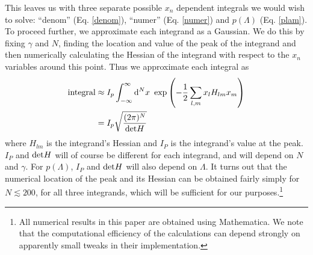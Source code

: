 \documentclass[12pt]{article}
\begin{document}
This leaves us with three separate possible $x_n$ dependent integrals we would wish to solve: ``denom'' (Eq. \ref{denom}), ``numer'' (Eq. \ref{numer}) and $p(\Lambda)$ (Eq. \ref{plam}). To proceed further, we approximate each integrand as a Gaussian. We do this by fixing $\gamma$ and $N$, finding the location and value of the peak of the integrand and then numerically calculating the Hessian of the integrand with respect to the $x_n$ variables around this point. Thus we approximate each integral as
%
\begin{align}\label{Gauss}
\begin{split}
{\rm integral} &\approx I_p\int_{-\infty}^{\infty} {\rm d}^Nx\,\, \exp\left(-\frac{1}{2}\sum_{l,m}x_lH_{lm}x_m\right) \\
&=I_p \sqrt{\frac{(2\pi)^N}{\mathrm{det} H}}
\end{split}
\end{align}
%
\noindent where $H_{lm}$ is the integrand's Hessian and $I_P$ is the integrand's value at the peak. $I_P$ and ${\rm det}H$ will of course be different for each integrand, and will depend on $N$ and $\gamma$. For $p(\Lambda)$, $I_P$ and ${\rm det} H$ will also depend on $\Lambda$. It turns out that the numerical location of the peak and its Hessian can be obtained fairly simply for $N\lesssim 200$, for all three integrands, which will be sufficient for our purposes.\footnote{All numerical results in this paper are obtained using Mathematica. We note that the computational efficiency of the calculations can depend strongly on apparently small tweaks in their implementation.}
\end{document}
